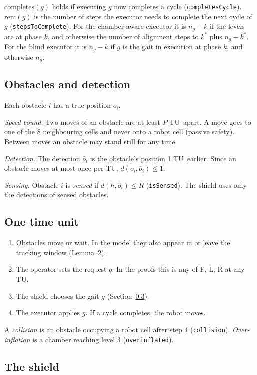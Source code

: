 \documentclass[11pt,a4paper]{article}
\theoremstyle{definition}
\newcommand{\tu}{TU}
\newcommand{\rem}{\mathrm{rem}}
\begin{document}
$\mathrm{completes}(g)$ holds if executing $g$ now completes a cycle (\texttt{completesCycle}). $\rem(g)$ is the number of steps the executor needs to complete the next cycle of $g$ (\texttt{stepsToComplete}). For the chamber-aware executor it is $n_g-k$ if the levels are at phase $k$, and otherwise the number of alignment steps to $k^*$ plus $n_g-k^*$. For the blind executor it is $n_g-k$ if $g$ is the gait in execution at phase $k$, and otherwise $n_g$.

\subsection{Obstacles and detection}

Each obstacle $i$ has a true position $o_i$.

\emph{Speed bound.} Two moves of an obstacle are at least $P$ \tu\ apart. A move goes to one of the 8 neighbouring cells and never onto a robot cell (passive safety). Between moves an obstacle may stand still for any time.

\emph{Detection.} The detection $\hat o_i$ is the obstacle's position 1 \tu\ earlier. Since an obstacle moves at most once per \tu, $d(o_i,\hat o_i)\le1$.

\emph{Sensing.} Obstacle $i$ is \emph{sensed} if $d(h,\hat o_i)\le R$ (\texttt{isSensed}). The shield uses only the detections of sensed obstacles.

\subsection{One time unit}

\begin{enumerate}
  \item Obstacles move or wait. In the model they also appear in or leave the tracking window (Lemma~2).
  \item The operator sets the request $q$. In the proofs this is any of F, L, R at any \tu.
  \item The shield chooses the gait $g$ (Section~\ref{sec:shield}).
  \item The executor applies $g$. If a cycle completes, the robot moves.
\end{enumerate}

A \emph{collision} is an obstacle occupying a robot cell after step 4 (\texttt{collision}). \emph{Over-inflation} is a chamber reaching level 3 (\texttt{overinflated}).

\subsection{The shield}\label{sec:shield}
\end{document}
